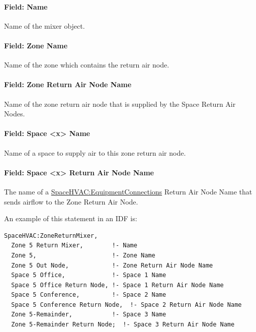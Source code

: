 \paragraph{Field: Name}\label{field-sretmixer-name-015}

Name of the mixer object.

\paragraph{Field: Zone Name}\label{field-sretmixer-zone-name}

Name of the zone which contains the return air node.

\paragraph{Field: Zone Return Air Node Name}\label{field-sretmixer-zone-return-air-node-name}

Name of the zone return air node that is supplied by the Space Return Air Nodes.

\paragraph{Field: Space \textless{}x\textgreater{} Name}\label{field-sretmixer-space-name}

Name of a space to supply air to this zone return air node.

\paragraph{Field: Space \textless{}x\textgreater{} Return Air Node Name}\label{field-sretmixer-space-node-name}

The name of a \hyperref[spacehvacequipmentconnections]{SpaceHVAC:EquipmentConnections} Return Air Node Name that sends airflow to the Zone Return Air Node.

An example of this statement in an IDF is:

\begin{lstlisting}
SpaceHVAC:ZoneReturnMixer,
  Zone 5 Return Mixer,        !- Name
  Zone 5,                     !- Zone Name
  Zone 5 Out Node,            !- Zone Return Air Node Name
  Space 5 Office,             !- Space 1 Name
  Space 5 Office Return Node, !- Space 1 Return Air Node Name
  Space 5 Conference,         !- Space 2 Name
  Space 5 Conference Return Node,  !- Space 2 Return Air Node Name
  Zone 5-Remainder,           !- Space 3 Name
  Zone 5-Remainder Return Node;  !- Space 3 Return Air Node Name
\end{lstlisting}
